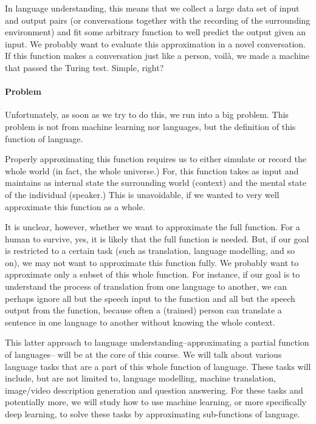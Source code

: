 \documentclass{report}
\begin{document}
In language understanding, this means that we collect a large data set of input
and output pairs (or conversations together with the recording of the
surrounding environment) and fit some arbitrary function to well predict the
output given an input. We probably want to evaluate this approximation in a
novel conversation. If this function makes a conversation just like a person,
voil\`{a}, we made a machine that passed the Turing test.  Simple, right?

\paragraph{Problem}
Unfortunately, as soon as we try to do this, we run into a big problem. This
problem is not from machine learning nor languages, but the definition of this
function of language.

Properly approximating this function requires us to either simulate or record
the whole world (in fact, the whole universe.) For, this function takes as input
and maintains as internal state the surrounding world (context) and the mental
state of the individual (speaker.) This is unavoidable, if we wanted to very
well approximate this function as a whole.

It is unclear, however, whether we want to approximate the full function. For a
human to survive, yes, it is likely that the full function is needed. But, if
our goal is restricted to a certain task (such as translation, language
modelling, and so on), we may not want to approximate this function fully. We
probably want to approximate only a subset of this whole function. For instance,
if our goal is to understand the process of translation from one language to
another, we can perhaps ignore all but the speech input to the function and all
but the speech output from the function, because often a (trained) person can
translate a sentence in one language to another without knowing the whole
context.

This latter approach to language understanding--approximating a partial function
of languages-- will be at the core of this course. We will talk about various
language tasks that are a part of this whole function of language. These tasks
will include, but are not limited to, language modelling, machine translation,
image/video description generation and question answering. For these tasks and
potentially more, we will study how to use machine learning, or more
specifically deep learning, to solve these tasks by approximating sub-functions
of language.
\end{document}
